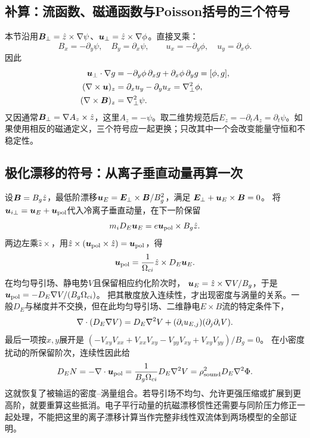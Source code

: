 \documentclass[UTF8,a4paper,11pt,openany,fontset=fandol]{ctexbook}
\begin{document}
\subsection{补算：流函数、磁通函数与Poisson括号的三个符号}
本节沿用$\bm{B}_\perp=\hat z\times\nabla\psi$、$\bm{u}_\perp=\hat z\times\nabla\phi$。直接叉乘：
\begin{equation}
 B_x=-\partial_y\psi,\quad B_y=\partial_x\psi,\qquad
 u_x=-\partial_y\phi,\quad u_y=\partial_x\phi.
\end{equation}
因此
\begin{align}
 \bm{u}_\perp\cdot\nabla g
 &=-\partial_y\phi\,\partial_xg+\partial_x\phi\,\partial_yg
 =[\phi,g],\\
 (\nabla\times\bm{u})_z
 &=\partial_xu_y-\partial_yu_x=\nabla_\perp^2\phi,\\
 (\nabla\times\bm{B})_z&=\nabla_\perp^2\psi.
\end{align}
又因通常$\bm{B}_\perp=\nabla A_z\times\hat z$，这里$A_z=-\psi$。取二维势规范后$E_z=-\partial_tA_z=\partial_t\psi$。如果使用相反的磁通定义，三个符号应一起更换；只改其中一个会改变能量守恒和不稳定性。

\subsection{极化漂移的符号：从离子垂直动量再算一次}
设$\bm{B}=B_g\hat z$，最低阶漂移$\bm{u}_E=\bm{E}_\perp\times\bm{B}/B_g^2$，满足
$\bm{E}_\perp+\bm{u}_E\times\bm{B}=0$。
将$\bm{u}_{i\perp}=\bm{u}_E+\bm{u}_{\rm pol}$代入冷离子垂直动量，在下一阶保留
\begin{equation}
 m_iD_E\bm{u}_E=e\bm{u}_{\rm pol}\times B_g\hat z.
\end{equation}
两边左乘$\hat z\times$，用$\hat z\times(\bm{u}_{\rm pol}\times\hat z)=\bm{u}_{\rm pol}$，得
\begin{equation}
 \bm{u}_{\rm pol}={1\over\Omega_{ci}}\hat z\times D_E\bm{u}_E.
\end{equation}
在均匀导引场、静电势$V$且保留相应约化阶次时，
$\bm{u}_E=\hat z\times\nabla V/B_g$，于是
$\bm{u}_{\rm pol}=-D_E\nabla V/(B_g\Omega_{ci})$。
把其散度放入连续性，才出现密度与涡量的关系。一般$D_E$与梯度并不交换，但在此均匀导引场、二维静电$E\times B$流的特定条件下，
\begin{equation}
 \nabla\cdot(D_E\nabla V)
 =D_E\nabla^2V+(\partial_i u_{E,j})(\partial_j\partial_iV).
\end{equation}
最后一项按$x,y$展开是
$(-V_{xy}V_{xx}+V_{xx}V_{xy}-V_{yy}V_{xy}+V_{xy}V_{yy})/B_g=0$。
在小密度扰动的所保留阶次，连续性因此给
\begin{equation}
 D_EN=-\nabla\cdot\bm{u}_{\rm pol}
 ={1\over B_g\Omega_{ci}}D_E\nabla^2V
 =\rho_{\rm sound}^2D_E\nabla^2\Phi.
\end{equation}
这就恢复了被输运的密度--涡量组合。若导引场不均匀、允许更强压缩或扩展到更高阶，就要重算这些抵消。电子平行动量的抗磁漂移惯性还需要与同阶压力修正一起处理，不能把这里的离子漂移计算当作完整非线性双流体到两场模型的全部证明。\citep{Schep1994,L049}
\end{document}
